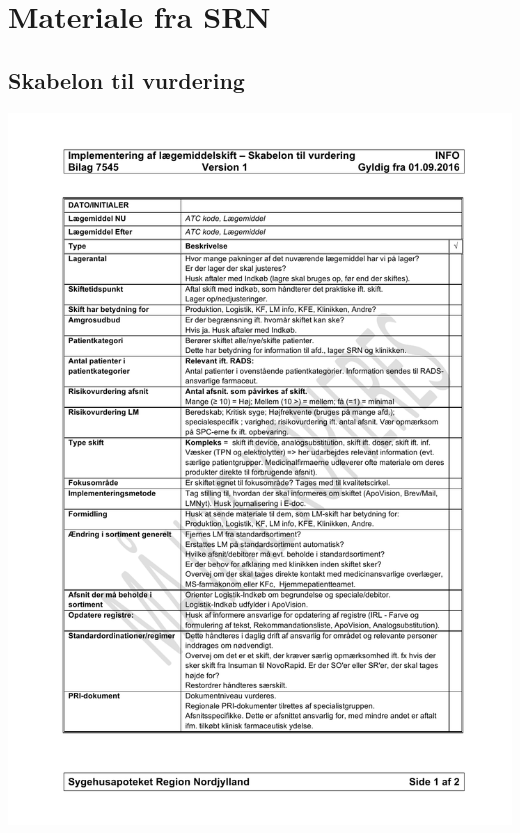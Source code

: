 
\newpage														%
\listoffixmes													%



\appendix


% 

\chapter{Materiale fra SRN} \vspace{-1cm} \section{Skabelon til vurdering}\label{App:Skabelon} 
\vspace{-1.2cm}
\includegraphics[scale=0.7]{appendiks/skabelon.pdf}

